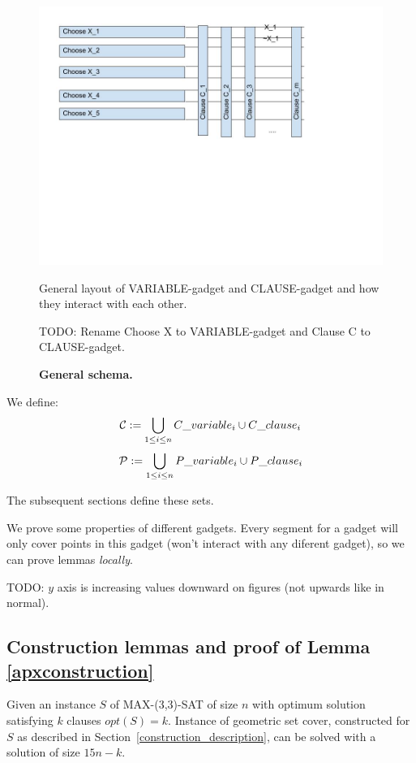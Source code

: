 \begin{figure}
\centering
\includegraphics[width=\linewidth]{segment_apx_sketch.jpg}
\caption{\textbf{General schema.}}
General layout of VARIABLE-gadget and CLAUSE-gadget and how they
interact with each other.

TODO: Rename Choose X to VARIABLE-gadget and Clause C to CLAUSE-gadget.
\label{fig:segment_apx_sketch}
\end{figure}

We define:
$$\mathcal{C} := \bigcup_{1 \le i \le n} C\_variable_i \cup C\_clause_i $$
$$\mathcal{P} := \bigcup_{1 \le i \le n} P\_variable_i \cup P\_clause_i $$

The subsequent sections define these sets.

We prove some properties of different gadgets.
Every segment for a gadget will only cover points 
in this gadget (won't interact with any diferent gadget),
so we can prove lemmas \textit{locally}.


TODO: $y$ axis is increasing values downward on figures
(not upwards like in normal).



\subsection{Construction lemmas and proof of Lemma \ref{apxconstruction}}
\begin{lemma}
	\label{construction_correctness}
	Given an instance $S$ of MAX-(3,3)-SAT of size $n$
	with optimum solution satisfying $k$ clauses $opt(S) = k$.
	Instance of geometric set cover, constructed for $S$
	as described in Section~\ref{construction_description}, 
	can be solved with a solution of size $15n - k$.
\end{lemma}

